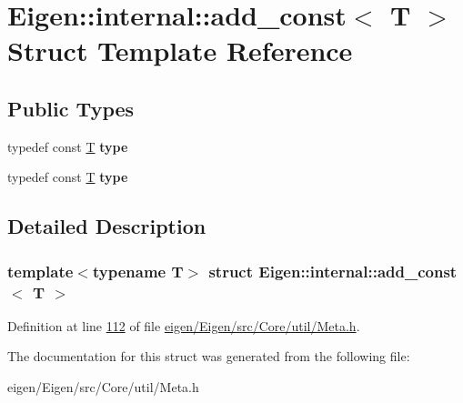 \hypertarget{struct_eigen_1_1internal_1_1add__const}{}\section{Eigen\+:\+:internal\+:\+:add\+\_\+const$<$ T $>$ Struct Template Reference}
\label{struct_eigen_1_1internal_1_1add__const}
\subsection*{Public Types}
\begin{DoxyCompactItemize}
\item 
\mbox{\label{struct_eigen_1_1internal_1_1add__const_a26e88d975dcad60a4907a93c7498f392}} 
typedef const \hyperlink{group___sparse_core___module}{T} {\bfseries type}
\item 
\mbox{\label{struct_eigen_1_1internal_1_1add__const_a26e88d975dcad60a4907a93c7498f392}} 
typedef const \hyperlink{group___sparse_core___module}{T} {\bfseries type}
\end{DoxyCompactItemize}


\subsection{Detailed Description}
\subsubsection*{template$<$typename T$>$\newline
struct Eigen\+::internal\+::add\+\_\+const$<$ T $>$}



Definition at line \hyperlink{eigen_2_eigen_2src_2_core_2util_2_meta_8h_source_l00112}{112} of file \hyperlink{eigen_2_eigen_2src_2_core_2util_2_meta_8h_source}{eigen/\+Eigen/src/\+Core/util/\+Meta.\+h}.



The documentation for this struct was generated from the following file\+:\begin{DoxyCompactItemize}
\item 
eigen/\+Eigen/src/\+Core/util/\+Meta.\+h\end{DoxyCompactItemize}
